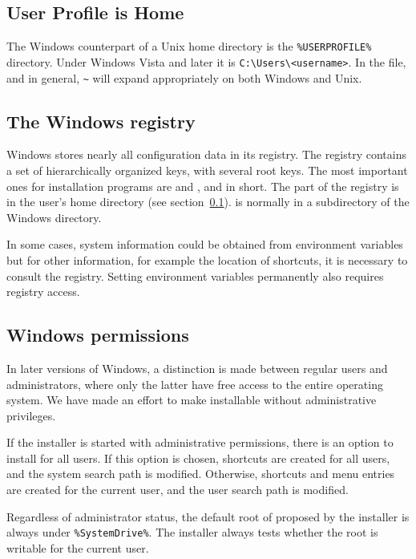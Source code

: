 \documentclass{article}
\begin{document}
\subsection{User Profile is Home}
\label{sec:winhome}

The Windows counterpart of a Unix home directory is the
\verb|%USERPROFILE%| directory.  Under Windows Vista and later it is
\verb|C:\Users\<username>|.  In the
 file, and \KPS{} in general, \verb|~| will
expand appropriately on both Windows and Unix.


\subsection{The Windows registry}
\label{sec:registry}

Windows stores nearly all configuration data in its registry.  The
registry contains a set of hierarchically organized keys, with several
root keys. The most important ones for installation programs are
 and ,  and
 in short. The  part of the registry is in the
user's home directory (see section~\ref{sec:winhome}).   is
normally in a subdirectory of the Windows directory.

In some cases, system information could be obtained from environment
variables but for other information, for example the location of
shortcuts, it is necessary to consult the registry.  Setting environment
variables permanently also requires registry access.


\subsection{Windows permissions}
\label{sec:winpermissions}

In later versions of Windows, a distinction is made between regular
users and administrators, where only the latter have free access to the
entire operating system. We have made an effort to make \TL{}
installable without administrative privileges.

If the installer is started with administrative permissions, there is an
option to install for all users.  If this option is chosen, shortcuts
are created for all users, and the system search path is
modified. Otherwise, shortcuts and menu entries are created for the
current user, and the user search path is modified.

Regardless of administrator status, the default root of \TL{} proposed
by the installer is always under \verb|%SystemDrive%|. The installer
always tests whether the root is writable for the current user.
\end{document}
